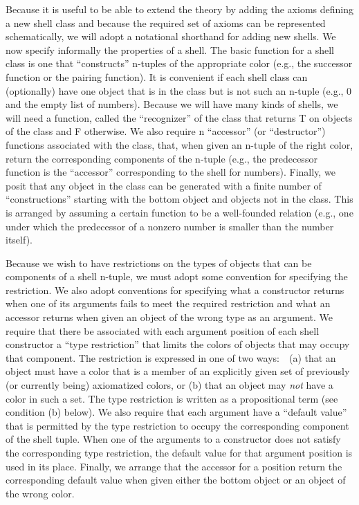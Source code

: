 \documentclass[11pt]{book}
\newcommand{\pubinlineunderline}[1]{\emph{#1}}
\begin{document}
Because it is  useful to be able to extend the theory by
adding the axioms defining a new shell class and because the
required set of axioms can be  represented schematically, we will
adopt a notational shorthand for adding new shells.  We now specify informally
 the properties of a shell.  The basic
function for a shell class is one that ``constructs'' n-tuples of the appropriate
color  (e.g., the successor function
or the pairing function). It is convenient if each shell class can (optionally) have
one object that is in the class but is not such an n-tuple (e.g., 0 and the empty
list of numbers).  Because we will have many kinds of shells,
we will need a function, called the ``recognizer'' of the class that
returns T on objects of the class and F otherwise.  We also require n ``accessor'' (or ``destructor'') functions associated with the class, that,
when given an n-tuple of the right color,  return the corresponding
components of the n-tuple (e.g., the predecessor function is the ``accessor''
corresponding to the shell for numbers).  Finally, we posit that
any object in the class can be generated with a finite number of
``constructions'' starting with the bottom object and objects not
in the class.
This is arranged by assuming a certain function to be a well-founded relation
(e.g., one under which the predecessor of a
nonzero  number is smaller than the number itself).

Because we wish to have
restrictions on the types of objects that can be components of a shell n-tuple,
we must adopt some convention for specifying the restriction.
We also adopt conventions for specifying what a constructor returns when
one of its arguments fails to meet the required restriction and what
an accessor returns when given an object of the wrong type as an argument.  We require
that there be associated with each argument position of each shell constructor
a ``type restriction'' that limits the colors of objects that may occupy
that component.  The restriction is expressed in one of two ways:~~(a)
that an object must have a color that is a member of an explicitly given set of
previously (or currently being) axiomatized colors, or (b) that an object
may \pubinlineunderline{not} have a color in such a set.  The type restriction is written
as a propositional term (see condition (b) below).  We also require
that each argument have a ``default value'' that is permitted by the
type restriction to occupy the corresponding component of the shell tuple.
When one of the arguments to a constructor does not satisfy the corresponding
type restriction, the default value for that argument position is used in its place.
Finally, we  arrange  that
the accessor for a position return the corresponding
default value when given either the bottom object or an object of the wrong
color.
\end{document}
